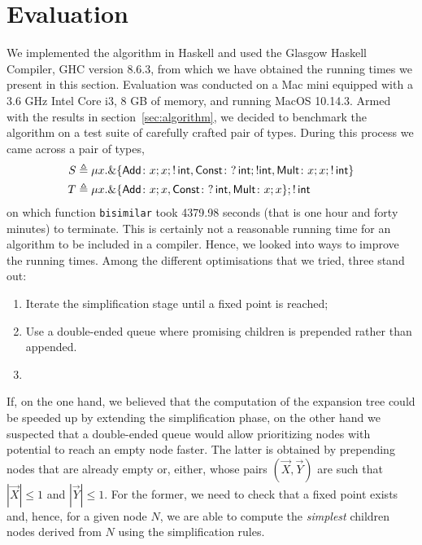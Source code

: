 \section{Evaluation}
\label{sec:evaluation}


We implemented the algorithm
in Haskell and used the Glasgow Haskell Compiler, GHC version 8.6.3,
from which we have obtained the running times we present in this
section.  Evaluation was conducted on a Mac mini equipped with a 3.6
GHz Intel Core i3, 8 GB of memory, and running MacOS 10.14.3.
%
Armed with the results in section~\ref{sec:algorithm}, we decided to
benchmark the algorithm on a test suite of carefully crafted pair of
types. During this process we came across a pair of types,
\begin{equation}
\label{ex:chaotic}
\begin{aligned}
  S &\triangleq \mu x . \&\{ \mathsf{Add}\colon x;x; !\,\mathsf{int},
  \mathsf{Const}\colon ?\,\mathsf{int};!\mathsf{int},
  \mathsf{Mult}\colon x;x;!\,\mathsf{int}\}
  \\
  T &\triangleq \mu x . \&\{ \mathsf{Add}\colon x;x,
  \mathsf{Const}\colon ?\,\mathsf{int},
  \mathsf{Mult}\colon x;x\}; !\,\mathsf{int}
\end{aligned}
\end{equation}
%
on which function \lstinline|bisimilar| took 4379.98 seconds (that is
one hour and forty minutes) to terminate. This is certainly not a
reasonable running time for an algorithm to be included in a
compiler. Hence, we looked into ways to improve the running
times. Among the different optimisations that we tried, three stand
out:
\begin{enumerate}
\item Iterate the simplification stage until a fixed point is reached;
\item Use a double-ended queue where promising children is prepended
  rather than appended.
\item {}
\end{enumerate}

If, on the one hand, we believed that the computation of the expansion
tree could be speeded up by extending the simplification phase, on the
other hand we suspected that a double-ended queue would allow
prioritizing nodes with potential to reach an empty node faster.  The
latter is obtained by prepending nodes that are already empty or,
either, whose pairs $(\vec X, \vec Y)$ are such that $|\vec X|\leq 1$
and $|\vec Y| \leq 1$.  For the former, we need to check that a fixed
point exists and, hence, for a given node $N$, we are able to compute
the \emph{simplest} children nodes derived from $N$ using the
simplification rules.


